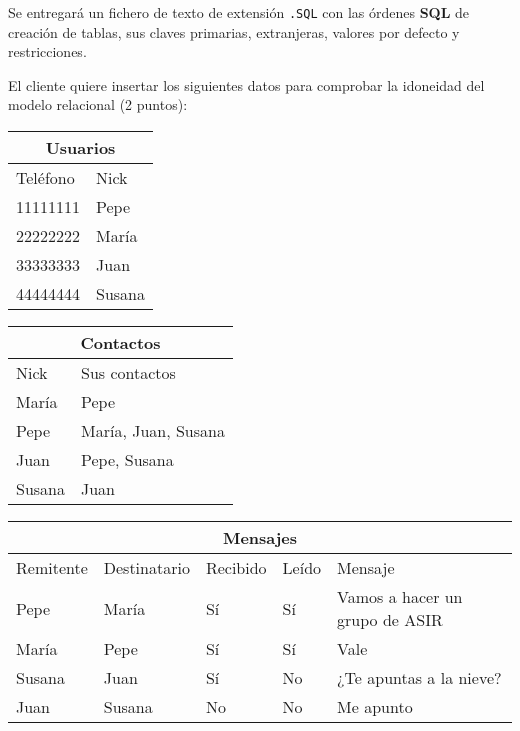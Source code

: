 \begin{homeworkProblem}
  Se entregará un fichero de texto de extensión \texttt{.SQL} con las órdenes \textbf{SQL} de creación de tablas, sus claves primarias, extranjeras, valores por defecto y restricciones.

\end{homeworkProblem}



\begin{homeworkProblem}

  El cliente quiere insertar los siguientes datos para comprobar la idoneidad del modelo relacional (2 puntos):
  \begin{center}
  \begin{tabular}{|l|l|}
    \hline
    \multicolumn{2}{|c|}{Usuarios} \\
    \hline
    Teléfono & Nick \\
    \hline
    11111111 & Pepe \\
    22222222 & María \\
    33333333 & Juan \\
    44444444 & Susana \\
    \hline
  \end{tabular}
  \begin{tabular}{|l|l|}
    \hline
    \multicolumn{2}{|c|}{Contactos} \\
    \hline
    Nick & Sus contactos\\
    \hline
    María & Pepe \\
    Pepe & María, Juan, Susana \\
    Juan & Pepe, Susana \\
    Susana & Juan \\
    \hline
  \end{tabular}
  
  \begin{tabular}{|l|l|l|l|l|}
    \hline
    \multicolumn{5}{|c|}{Mensajes} \\
    \hline
    Remitente & Destinatario & Recibido & Leído & Mensaje \\
    \hline
    Pepe & María & Sí & Sí & Vamos a hacer un grupo de ASIR \\
    María & Pepe & Sí & Sí & Vale \\
    Susana & Juan & Sí & No & ¿Te apuntas a la nieve? \\
    Juan & Susana & No & No & Me apunto \\
    \hline
  \end{tabular}
  

\end{center}
\end{homeworkProblem}
